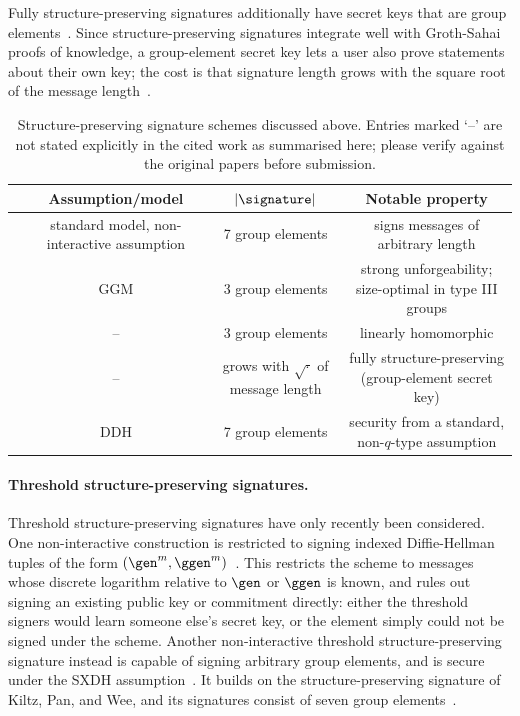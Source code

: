 Fully structure-preserving signatures additionally have secret keys that are
group elements~\cite{JC:AGKOT19}. Since structure-preserving signatures
integrate well with Groth-Sahai proofs of knowledge, a group-element secret
key lets a user also prove statements about their own key; the cost is that
signature length grows with the square root of the message
length~\cite{EC:GroSah08}.

\begin{table}[!ht]
  \centering
  \begin{tabular}{ c || c | c | c }
   \toprule
    & Assumption/model & $|\signature|$ & Notable property \\
   \midrule
    \cite{C:AFGHO10} & standard model, non-interactive assumption & 7 group elements & signs messages of arbitrary length \\
    \cite{C:AGHO11} & GGM & 3 group elements & strong unforgeability; size-optimal in type III groups \\
    \cite{C:LPJY13} & -- & 3 group elements & linearly homomorphic \\
    \cite{JC:AGKOT19} & -- & grows with $\sqrt{\cdot}$ of message length & fully structure-preserving (group-element secret key) \\
    \cite{C:KilPanWee15} & DDH & 7 group elements & security from a standard, non-$q$-type assumption \\
   \bottomrule
  \end{tabular}
  \caption{Structure-preserving signature schemes discussed above. Entries
  marked `--' are not stated explicitly in the cited work as summarised
  here; please verify against the original papers before submission.}
  \label{table:related-sps}
\end{table}

\paragraph{Threshold structure-preserving signatures.} Threshold
structure-preserving signatures have only recently been considered. One
non-interactive construction is restricted to signing indexed
Diffie-Hellman tuples of the form $(\gen^m, \ggen^m)$~\cite{AC:CKPSS23}. This
restricts the scheme to messages whose discrete logarithm relative to $\gen$
or $\ggen$ is known, and rules out signing an existing public key or
commitment directly: either the threshold signers would learn someone else's
secret key, or the element simply could not be signed under the scheme.
Another non-interactive threshold structure-preserving signature instead is
capable of signing arbitrary group elements, and is secure under the SXDH
assumption~\cite{PKC:MMSST24}. It builds on the structure-preserving
signature of Kiltz, Pan, and Wee, and its signatures consist of seven group
elements~\cite{C:KilPanWee15}.

